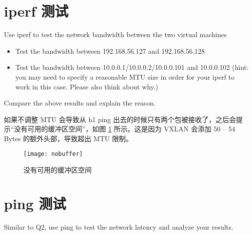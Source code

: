     \section{iperf 测试}
    Use iperf to test the network bandwidth between the two virtual machines 
    \begin{itemize}
        \item Test the bandwidth between 192.168.56.127 and 192.168.56.128
        \item Test the bandwidth between 10.0.0.1/10.0.0.2/10.0.0.101 and 10.0.0.102 (hint: you may need to specify a reasonable MTU size in order for your iperf to work in this case. Please also think about why.)
    \end{itemize}

    Compare the above results and explain the reason. 

    如果不调整 MTU 会导致从 h1 ping 出去的时候只有两个包被接收了，之后会提示“没有可用的缓冲区空间”，如图 \ref{fig:nobuffer} 所示。这是因为 VXLAN 会添加 50 -- 54 Bytes 的额外头部，导致超出 MTU 限制。

    \begin{figure}[H]
        \centering
        \texttt{[image: nobuffer]}
        \caption{没有可用的缓冲区空间}\label{fig:nobuffer}
    \end{figure}

    \section{ping 测试}
    Similar to Q2, use ping to test the network latency and analyze your results.
    
